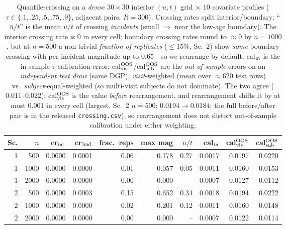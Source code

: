 \begin{table}[t]\centering\small
\caption{Quantile-crossing on a \emph{dense} $30\times30$ interior $(u,t)$ grid $\times$ $10$ covariate profiles ($\tau\in\{.1,.25,.5,.75,.9\}$, adjacent pairs; $R=300$). Crossing rates split interior/boundary; ``$\bar u/t$'' is the mean $u/t$ of crossing \emph{incidents} (small $\Rightarrow$ near the low-age boundary). The interior crossing rate is $0$ in every cell; boundary crossing rates round to $\approx0$ by $n=1000$, but at $n{=}500$ a non-trivial \emph{fraction of replicates} ($\le15\%$, Sc.~2) show \emph{some} boundary crossing with per-incident magnitude up to $0.65$---so we rearrange by default. cal$_{\rm in}$ is the in-sample $\tau$-calibration error; cal$^{\rm OOS}_{\rm vis}$/cal$^{\rm OOS}_{\rm sub}$ are the \emph{out-of-sample} errors on an \emph{independent test draw} (same DGP), \emph{visit}-weighted (mean over $\approx620$ test rows) vs.\ \emph{subject}-equal-weighted (so multi-visit subjects do not dominate). The two agree ($0.011$--$0.022$); cal$^{\rm OOS}_{\rm vis}$ is the value \emph{before} rearrangement, and rearrangement shifts it by at most $0.001$ in every cell (largest, Sc.~2 $n{=}500$: $0.0194\!\to\!0.0184$; the full before/after pair is in the released \texttt{crossing.csv}), so rearrangement does not distort out-of-sample calibration under either weighting.}
\label{tab:crossing}\begin{tabular}{rr rr r r r r rr}\toprule
Sc.&$n$&cr$_{\rm int}$&cr$_{\rm bnd}$&frac.\ reps&max mag&$\bar u/t$&cal$_{\rm in}$&cal$^{\rm OOS}_{\rm vis}$&cal$^{\rm OOS}_{\rm sub}$\\\midrule
1 & 500 & 0.0000 & 0.0001 & 0.06 & 0.178 & 0.27 & 0.0017 & 0.0197 & 0.0220 \\
1 & 1000 & 0.0000 & 0.0000 & 0.01 & 0.057 & 0.05 & 0.0011 & 0.0160 & 0.0153 \\
1 & 2000 & 0.0000 & 0.0000 & 0.00 & 0.000 & -- & 0.0007 & 0.0127 & 0.0112 \\
2 & 500 & 0.0000 & 0.0003 & 0.15 & 0.652 & 0.34 & 0.0018 & 0.0194 & 0.0222 \\
2 & 1000 & 0.0000 & 0.0000 & 0.02 & 0.201 & 0.12 & 0.0011 & 0.0160 & 0.0148 \\
2 & 2000 & 0.0000 & 0.0000 & 0.00 & 0.000 & -- & 0.0007 & 0.0122 & 0.0114 \\
\bottomrule\end{tabular}\end{table}
